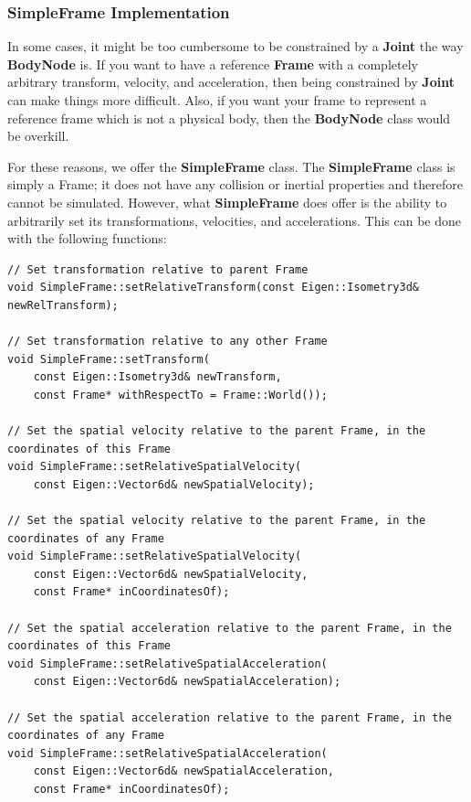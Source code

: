 \subsubsection{SimpleFrame Implementation}
\label{sec:SimpleFrame}
In some cases, it might be too cumbersome to be constrained by a \textbf{Joint} the way \textbf{BodyNode} is. If you want to have a reference \textbf{Frame} with a completely arbitrary transform, velocity, and acceleration, then being constrained by \textbf{Joint} can make things more difficult. Also, if you want your frame to represent a reference frame which is not a physical body, then the \textbf{BodyNode} class would be overkill.

For these reasons, we offer the \textbf{SimpleFrame} class. The \textbf{SimpleFrame} class is simply a Frame; it does not have any collision or inertial properties and therefore cannot be simulated. However, what \textbf{SimpleFrame} does offer is the ability to arbitrarily set its transformations, velocities, and accelerations. This can be done with the following functions:

\begin{lstlisting}
// Set transformation relative to parent Frame
void SimpleFrame::setRelativeTransform(const Eigen::Isometry3d& newRelTransform);

// Set transformation relative to any other Frame
void SimpleFrame::setTransform(
    const Eigen::Isometry3d& newTransform,
    const Frame* withRespectTo = Frame::World());
    
// Set the spatial velocity relative to the parent Frame, in the coordinates of this Frame
void SimpleFrame::setRelativeSpatialVelocity(
    const Eigen::Vector6d& newSpatialVelocity);
    
// Set the spatial velocity relative to the parent Frame, in the coordinates of any Frame
void SimpleFrame::setRelativeSpatialVelocity(
    const Eigen::Vector6d& newSpatialVelocity,
    const Frame* inCoordinatesOf);
    
// Set the spatial acceleration relative to the parent Frame, in the coordinates of this Frame
void SimpleFrame::setRelativeSpatialAcceleration(
    const Eigen::Vector6d& newSpatialAcceleration);

// Set the spatial acceleration relative to the parent Frame, in the coordinates of any Frame
void SimpleFrame::setRelativeSpatialAcceleration(
    const Eigen::Vector6d& newSpatialAcceleration,
    const Frame* inCoordinatesOf);
\end{lstlisting}

